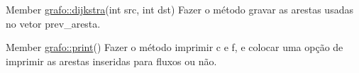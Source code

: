 \label{todo__todo000002}
\hypertarget{todo__todo000002}{}
 
\begin{DoxyDescription}
\item[Member \hyperlink{structgrafo_aca0027d6158bf78e948fcde0f1b72cb2}{grafo::dijkstra}(int src, int dst) ]Fazer o método gravar as arestas usadas no vetor prev\_\-aresta. 
\end{DoxyDescription}

\label{todo__todo000001}
\hypertarget{todo__todo000001}{}
 
\begin{DoxyDescription}
\item[Member \hyperlink{structgrafo_afd949f9470a970902ffa14a665c78fde}{grafo::print}() ]Fazer o método imprimir c e f, e colocar uma opção de imprimir as arestas inseridas para fluxos ou não. 
\end{DoxyDescription}